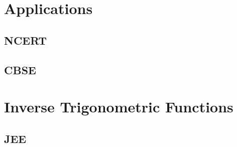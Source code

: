 \documentclass[journal]{IEEEtran}
\begin{document}
\section{Applications}
\subsection{NCERT}

\subsection{CBSE}

\section{Inverse Trigonometric Functions}
\subsection{JEE}
 
%
% 
\end{document}
